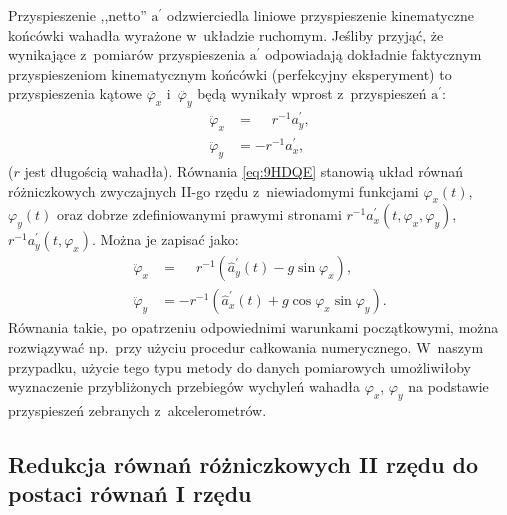 \documentclass[paper=a4,DIV=12]{lpas}
\newcommand{\brm}[1]{\bm{\mathrm{#1}}}
\begin{document}
\begin{appendices}
Przyspieszenie ,,netto'' $\brm{a}^{\prime}$ odzwierciedla liniowe
przyspieszenie kinematyczne końcówki wahadła wyrażone w~układzie ruchomym.
Jeśliby przyjąć, że wynikające z~pomiarów przyspieszenia $\brm{a}^{\prime}$
odpowiadają dokładnie faktycznym przyspieszeniom kinematycznym końcówki
(perfekcyjny eksperyment) to przyspieszenia kątowe $\ddot{\varphi_x}$
i~$\ddot{\varphi_y}$ będą wynikały wprost z~przyspieszeń $\brm{a}^{\prime}$:
\begin{subequations}
  \label{eq:9HDQE}
  \begin{align}
    \ddot{\varphi}_x &=\phantom{-}r^{-1} a_y^{\prime},
    \label{eq:UIQUR}
    \\
    \ddot{\varphi}_y &=         - r^{-1} a_x^{\prime},
    \label{eq:ZBLRS}
  \end{align}
\end{subequations}
($r$ jest długością wahadła). Równania \eqref{eq:9HDQE} stanowią
układ równań różniczkowych zwyczajnych II-go rzędu z~niewiadomymi funkcjami
$\varphi_x(t)$, $\varphi_y(t)$ oraz dobrze zdefiniowanymi prawymi stronami
$r^{-1}a_x^{\prime}(t,\varphi_x,\varphi_y)$, $r^{-1}a_y^{\prime}(t,\varphi_x)$.
Można je zapisać jako:
\begin{subequations}
  \label{eq:ROGUO}
  \begin{align}
    \ddot{\varphi}_x & = \phantom{-} r^{-1} \left(
      \hat{a}_y^{\prime}\left(t\right) - g \sin{\varphi_x}
    \right),
    \label{eq:HRYMM}
    \\
    \ddot{\varphi}_y & = - r^{-1} \left(
        \hat{a}_x^{\prime}\left(t\right) + g \cos{\varphi_x} \sin{\varphi_y}
    \right).
    \label{eq:D4N2B}
  \end{align}
\end{subequations}
Równania takie, po opatrzeniu odpowiednimi warunkami początkowymi, można
rozwiązywać np.~przy użyciu procedur całkowania numerycznego. W~naszym
przypadku, użycie tego typu metody do danych pomiarowych umożliwiłoby
wyznaczenie przybliżonych przebiegów wychyleń wahadła $\varphi_x$, $\varphi_y$
na podstawie przyspieszeń zebranych z~akcelerometrów.

\subsection{Redukcja równań różniczkowych II rzędu do postaci równań I rzędu}
\label{sec:WKKBB}


\end{appendices}
\end{document}
